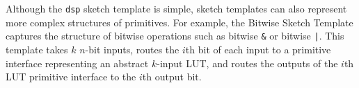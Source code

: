 

Although the \texttt{dsp} sketch template is simple, sketch templates can
  also represent more complex structures of primitives.
  For example, the Bitwise Sketch Template
  captures the structure of
  bitwise operations such as
  bitwise \texttt{\&}
  or bitwise \texttt{|}.
This template takes
  $k$ $n$-bit
  inputs,
  routes the $i$th bit of
  each input
  to a primitive interface
  representing an
  abstract $k$-input LUT,
  and routes the outputs
  of the $i$th LUT primitive
  interface to the $i$th output
  bit. 
  
  

  

  


